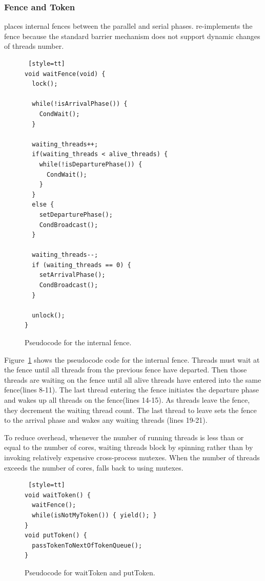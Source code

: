 \subsubsection{Fence and Token}
\label{sec:schedule}

\dthreads{} places internal fences between the parallel and serial phases. \dthreads{} re-implements the fence because the standard \pthreads{} barrier mechanism does not support dynamic changes of threads number. 

\begin{figure}
\begin{lstlisting} [style=tt]
void waitFence(void) {
  lock();
	
  while(!isArrivalPhase()) { 
    CondWait();
  }

  waiting_threads++;
  if(waiting_threads < alive_threads) {
    while(!isDeparturePhase()) {
      CondWait();
    }
  } 
  else {
    setDeparturePhase();
    CondBroadcast();
  }

  waiting_threads--;
  if (waiting_threads == 0) {
    setArrivalPhase();
    CondBroadcast();
  }

  unlock();
}

\end{lstlisting}
\caption{Pseudocode for the internal fence.\label{fig:internalFence}}
\end{figure}

Figure~\ref{fig:internalFence} shows the pseudocode code for the internal fence. Threads must wait at the fence until all threads from the previous fence have departed. Then those threads are waiting on the fence until all alive threads  have entered into the same fence(lines 8-11). 
The last thread entering the fence initiates the departure phase and wakes up all threads on the fence(lines 14-15). As threads leave the fence, they decrement the waiting thread count.  The last thread to leave sets the fence to the arrival phase and wakes any waiting threads (lines 19-21).

To reduce overhead, whenever the number of running threads is
less than or equal to the number of cores, waiting threads block by spinning rather than by invoking relatively expensive cross-process \pthreads{} mutexes. When the number of threads exceeds the number of cores, \dthreads{} falls back to using \pthreads{} mutexes.

\begin{figure}
\begin{lstlisting} [style=tt]
void waitToken() {
  waitFence();
  while(isNotMyToken()) { yield(); }
}
void putToken() {
  passTokenToNextOfTokenQueue();
}
\end{lstlisting}
\caption{Pseudocode for waitToken and putToken. 
\label{fig:token}}
\end{figure}

